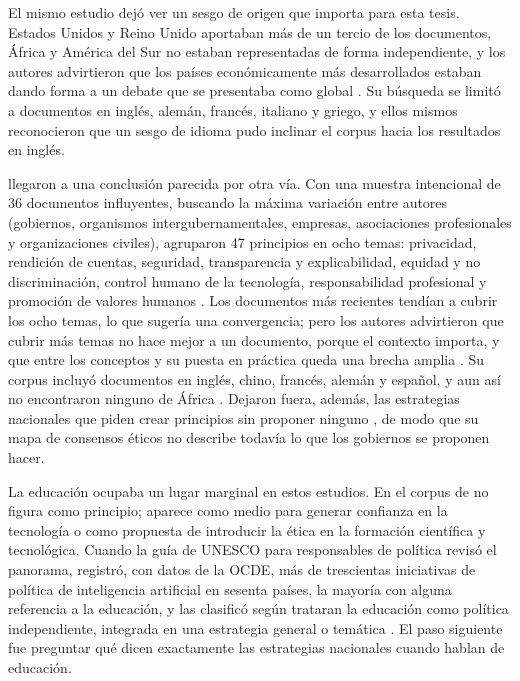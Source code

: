 El mismo estudio dejó ver un sesgo de origen que importa para esta tesis. Estados Unidos y
Reino Unido aportaban más de un tercio de los documentos, África y América del Sur no
estaban representadas de forma independiente, y los autores advirtieron que los países
económicamente más desarrollados estaban dando forma a un debate que se presentaba como
global \citep{jobin2019landscape}. Su búsqueda se limitó a documentos en inglés, alemán,
francés, italiano y griego, y ellos mismos reconocieron que un sesgo de idioma pudo inclinar
el corpus hacia los resultados en inglés.

\citet{fjeld2020principled} llegaron a una conclusión parecida por otra vía. Con una
muestra intencional de 36 documentos influyentes, buscando la máxima variación entre
autores (gobiernos, organismos intergubernamentales, empresas, asociaciones profesionales
y organizaciones civiles), agruparon 47 principios en ocho temas: privacidad, rendición de
cuentas, seguridad, transparencia y explicabilidad, equidad y no discriminación, control
humano de la tecnología, responsabilidad profesional y promoción de valores humanos
\citep[pp.~4, 14--15]{fjeld2020principled}. Los documentos más recientes tendían a cubrir
los ocho temas, lo que sugería una convergencia; pero los autores advirtieron que cubrir más
temas no hace mejor a un documento, porque el contexto importa, y que entre los conceptos y
su puesta en práctica queda una brecha amplia \citep[pp.~5, 66]{fjeld2020principled}. Su
corpus incluyó documentos en inglés, chino, francés, alemán y español, y aun así no
encontraron ninguno de África \citep[pp.~14--15]{fjeld2020principled}. Dejaron fuera,
además, las estrategias nacionales que piden crear principios sin proponer ninguno
\citep[pp.~12--13]{fjeld2020principled}, de modo que su mapa de consensos éticos no
describe todavía lo que los gobiernos se proponen hacer.

La educación ocupaba un lugar marginal en estos estudios. En el corpus de
\citet{jobin2019landscape} no figura como principio; aparece como medio para generar
confianza en la tecnología o como propuesta de introducir la ética en la formación
científica y tecnológica. Cuando la guía de UNESCO para responsables de política revisó el
panorama, registró, con datos de la OCDE, más de trescientas iniciativas de política de inteligencia artificial en
sesenta países, la mayoría con alguna referencia a la educación, y las clasificó según
trataran la educación como política independiente, integrada en una estrategia general o
temática \citep[p.~28]{miao2021guidance}. El paso siguiente fue preguntar qué dicen
exactamente las estrategias nacionales cuando hablan de educación.

